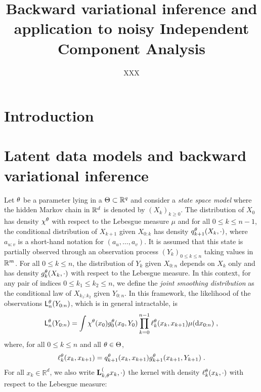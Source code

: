\documentclass{article}
\title{Backward variational inference and application to noisy Independent Component Analysis}
\date{}
\author[$\dag$]{XXX}
\affil[$\dag$]{{\small }}
\begin{document}
\maketitle

\begin{abstract}

\end{abstract}

\section{Introduction}

\section{Latent data models and backward variational inference}
Let $\theta$ be a parameter lying in a $\Theta\subset \mathbb{R}^q$ and consider a  \textit{state space model} where the hidden Markov chain  in $\mathbb{R}^d$ is denoted by $(X_k)_{k\geqslant 0}$. The distribution of $X_0$ has density $\chi^\theta$ with respect to the Lebesgue measure $\mu$ and for all $0\leqslant k \leqslant n-1$, the conditional distribution of $X_{k+1} $ given $X_{0:k}$ has density $q_{k+1}^{\theta}(X_{k},\cdot)$, where $a_{u:v}$ is a short-hand notation for $(a_u,\ldots,a_v)$. 
It is assumed that this state  is partially observed  through an observation process $(Y_k)_{0\leqslant k \leqslant n}$ taking values in $\mathbb{R}^m$. 
For all $0\leqslant k \leqslant n$, the distribution of $Y_k$ given $X_{0:n}$ depends on $X_k$ only and has density $g_{k}^{\theta}(X_k,\cdot)$ with respect to the Lebesgue measure. 
In this context, for any pair of indices $0\leqslant k_1 \leqslant k_2 \leqslant n$, we define the \textit{joint smoothing distribution} as the conditional law of $X_{k_1:k_2}$ given $Y_{0:n}$. 
In this framework, the likelihood of the observations $\mathsf{L}_{n}^{\theta}(Y_{0:n})$, which is  in general intractable, is
$$
\mathsf{L}_{n}^{\theta}(Y_{0:n})  = \int \chi^\theta(x_0)g_{0}^{\theta}(x_{0},Y_{0})\prod_{k=0}^{n-1} \ell_{k}^{\theta}(x_{k},x_{k+1})\mu(\mathrm{d} x_{0:n})\;,
$$
 where, for all $0\leqslant k \leqslant n$ and all $\theta\in\Theta$,
\begin{equation}
\label{eq:def:elln}
\ell_{k}^{\theta}(x_{k},x_{k+1}) = q_{k+1}^{\theta}(x_{k}, x_{k+1})g_{k+1}^{\theta}(x_{k+1},Y_{k+1})\;.
\end{equation}
For all $x_k\in\mathbb{R}^d$, we also write $\mathbf{L}_{k,\theta}^{(}x_k, \cdot)$ the kernel with density $\ell_{k}^{\theta}(x_{k},\cdot) $ with respect to the Lebesgue measure:
\end{document}
